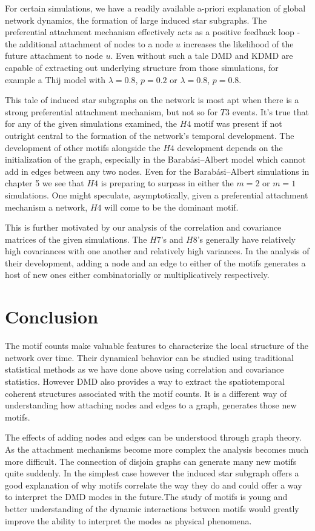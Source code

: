 For certain simulations, we have a readily available a-priori explanation
of global network dynamics, the formation of large induced star subgraphs. The preferential
attachment mechanism effectively acts as a positive feedback loop - the
additional attachment of nodes to a node $u$ increases
the likelihood of the future attachment to node $u$. Even without 
 such a tale DMD and KDMD are capable of extracting out underlying 
structure from those simulations, for example a Thij model with $\lambda=0.8$, $p=0.2$ or $\lambda=0.8$, $p=0.8$.

This tale of induced star subgraphs on the network is most apt when
there is a strong preferential attachment mechanism, but not so for $T3$ events.
 It's true that for any of the given simulations examined, the $H4$ motif was present if not outright
central to the formation of the network's temporal development. The development
of other motifs alongside the $H4$ development depends on the initialization
of the graph, especially in the Barabási–Albert model which cannot add in
edges between any two nodes. Even for the Barabási–Albert simulations in chapter 5 
we see that $H4$ is preparing to surpass in either the $m=2$ or $m=1$
simulations. One might speculate, asymptotically, given a preferential attachment
mechanism a network, $H4$ will come to be the dominant motif.

This is further motivated by our analysis of the correlation and covariance
matrices of the given simulations. The $H7$'s and $H8$'s generally have 
relatively high covariances with one another and relatively high variances.
In the analysis of their development, adding a node and an edge to either of the
motifs generates a host of new ones either combinatorially or multiplicatively 
respectively. 

\chapter{Conclusion}

The motif counts make valuable features to characterize the local structure 
of the network over time. Their dynamical behavior can be studied using
traditional statistical methods as we have done above using correlation
and covariance statistics. However DMD also provides a way to extract 
the spatiotemporal coherent structures associated with the motif counts. It 
is a different way of understanding how attaching nodes and edges to a graph,
generates those new motifs. 

The effects of adding nodes and edges can be understood through graph theory. As
the attachment mechanisms become more complex the analysis becomes much more
difficult. The connection of disjoin graphs can generate many new motifs quite
suddenly. In the simplest case however the induced star subgraph offers 
a good explanation of why motifs correlate the way they do and could 
offer a way to interpret the DMD modes in the future.The study 
of motifs is young and better understanding of the dynamic interactions 
between motifs would greatly improve the ability to interpret the modes as physical
phenomena. 

